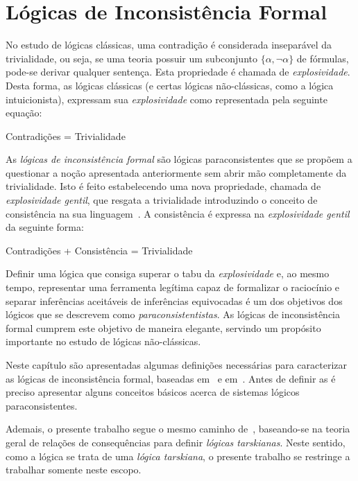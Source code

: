 \chapter{Lógicas de Inconsistência Formal}\label{cap:LFIs}
No estudo de lógicas clássicas, uma contradição é considerada inseparável da trivialidade, ou seja, se uma teoria possuir um subconjunto $\{\alpha,\neg \alpha\}$ de fórmulas, pode-se derivar qualquer sentença. Esta propriedade é chamada de \textit{explosividade}. Desta forma, as lógicas clássicas (e certas lógicas não-clássicas, como a lógica intuicionista), expressam sua \textit{explosividade} como representada pela seguinte equação: 
\begin{center}
    Contradições = Trivialidade
\end{center}
As \textit{lógicas de inconsistência formal} são lógicas paraconsistentes que se propõem a questionar a noção apresentada anteriormente sem abrir mão completamente da trivialidade. Isto é feito estabelecendo uma nova propriedade, chamada de \textit{explosividade gentil}, que resgata a trivialidade introduzindo o conceito de consistência na sua linguagem~\cite{carnielli2007}. A consistência é expressa na \textit{explosividade gentil} da seguinte forma:
\begin{center}
    Contradições + Consistência = Trivialidade
\end{center}
Definir uma lógica que consiga superar o tabu da \textit{explosividade} e, ao mesmo tempo, representar uma ferramenta legítima capaz de formalizar o raciocínio e separar inferências aceitáveis de inferências equivocadas é um dos objetivos dos lógicos que se descrevem como \textit{paraconsistentistas}. As lógicas de inconsistência formal cumprem este objetivo de maneira elegante, servindo um propósito importante no estudo de lógicas não-clássicas.

Neste capítulo são apresentadas algumas definições necessárias para caracterizar as lógicas de inconsistência formal, baseadas em~ e em~. Antes de definir as \lfis{} é preciso apresentar alguns conceitos básicos acerca de sistemas lógicos paraconsistentes.

Ademais, o presente trabalho segue o mesmo caminho de~, baseando-se na teoria geral de relações de consequências para definir \textit{lógicas tarskianas}. Neste sentido, como a lógica \lfium{} se trata de uma \textit{lógica tarskiana}, o presente trabalho se restringe a trabalhar somente neste escopo. 

